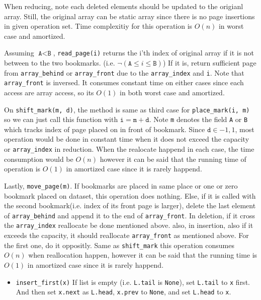 \documentclass[12pt,twoside]{article}
\begin{document}
\begin{problems}
When reducing, note each deleted elements should be updated to the
origianl array. Still, the original array can be static array since
there is no page insertions in given operation set. Time complexitiy
for this operation is $O(n)$ in worst case and amortized.

Assuming $\texttt{A} < \texttt{B}$, \texttt{read\_page(i)} returns the
i'th index of original array if it is not between to the two
bookmarks.  (i.e. $\neg(\texttt{A}\leq i \leq\texttt{B})$) If it is,
return sufficient page from \texttt{array\_behind} or
\texttt{array\_front} due to the \texttt{array\_index} and
\texttt{i}. Note that \texttt{array\_front} is inversed. It consumes
constant time on either cases since each access are array access, so
its $O(1)$ in both worst case and amortized.

On \texttt{shift\_mark(m, d)}, the method is same as third case for
\texttt{place\_mark(i, m)} so we can just call this function with
$\texttt{i} = \texttt{m} + \texttt{d}$. Note \texttt{m} denotes the
field \texttt{A} or \texttt{B} which tracks index of page placed on in
front of bookmark. Since $\texttt{d} \in {-1, 1}$, most operation
would be done in constant time when it does not exceed the capacity or
\texttt{array\_index} in reduction. When the realocate happend in each
case, the time consumption would be $O(n)$ however it can be said that
the running time of operation is $O(1)$ in amortized case since it is
rarely happend.

Lastly, \texttt{move\_page(m)}. If bookmarks are placed in same place
or one or zero bookmark placed on dataset, this operation does
nothing. Else, if it is called with the second bookmark(i.e. index of
its front page is larger), delete the last element of
\texttt{array\_behind} and append it to the end of
\texttt{array\_front}. In deletion, if it cross the
\texttt{array\_index} reallocate be done mentioned above. also, in
insertion, also if it exceeds the capacity, it should reallocate
\texttt{array\_front} as mentioned above. For the first one, do it
oppositly. Same as \texttt{shift\_mark} this operation consumes $O(n)$
when reallocation happen, however it can be said that the running time
is $O(1)$ in amortized case since it is rarely happend.

\newpage
\problem  %

\begin{problemparts}
  \problempart %
  \begin{itemize}
  \item \texttt{insert\_first(x)} If list is empty
    (i.e. \texttt{L.tail} is \texttt{None}), set \texttt{L.tail} to
    \texttt{x} first. And then set \texttt{x.next} as \texttt{L.head},
    \texttt{x.prev} to \texttt{None}, and set \texttt{L.head} to
    \texttt{x}.


\end{itemize}
\end{problemparts}
\end{problems}
\end{document}
